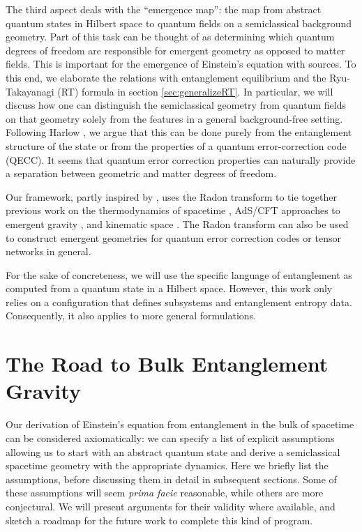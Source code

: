 \documentclass[%
12pt,preprint,
nofootinbib,
amsmath,amssymb,
aps,
prd,
showpacs,
superscriptaddress
]{revtex4-2}
\begin{document}
The third aspect deals with the ``emergence map'': the map from abstract quantum states in Hilbert space to quantum fields on a semiclassical background geometry.
Part of this task can be thought of as determining which quantum degrees of freedom are responsible for emergent geometry as opposed to matter fields. This is important for the emergence of Einstein's equation with sources. 
To this end, we elaborate the relations with entanglement equilibrium and the Ryu-Takayanagi (RT) formula in section \ref{sec:generalizeRT}. In particular, we will discuss how one can distinguish the semiclassical geometry from quantum fields on that geometry solely from the features in a general background-free setting. Following Harlow \cite{Harlow:2016vwg}, we argue that this can be done purely from the entanglement structure of the state or from the properties of a quantum error-correction code (QECC). 
It seems that quantum error correction properties can naturally provide a separation between geometric and matter degrees of freedom. 

Our framework, partly inspired by \cite{Czech:2016tqr}, uses the Radon transform to tie together previous work on the thermodynamics of spacetime \cite{Jacobson:1995ab,Jacobson:2015hqa}, AdS/CFT approaches to emergent gravity \cite{Faulkner:2013ica}, and kinematic space \cite{Czech:2015qta}. 
The Radon transform can also be used to construct emergent geometries for quantum error correction codes or tensor networks in general. 

For the sake of concreteness, we will use the specific language of entanglement as computed from a quantum state in a Hilbert space. However, this work only relies on a configuration that defines subsystems and entanglement entropy data. Consequently, it also applies to more general formulations.


\section{The Road to Bulk Entanglement Gravity}

Our derivation of Einstein's equation from entanglement in the bulk of spacetime can be considered axiomatically: we can specify a list of explicit assumptions allowing us to start with an abstract quantum state and derive a semiclassical spacetime geometry with the appropriate dynamics.
Here we briefly list the assumptions, before discussing them in detail in subsequent sections.
Some of these assumptions will seem \emph{prima facie} reasonable, while others are more conjectural.
We will present arguments for their validity where available, and sketch a roadmap for the future work to complete this kind of program.
\end{document}
